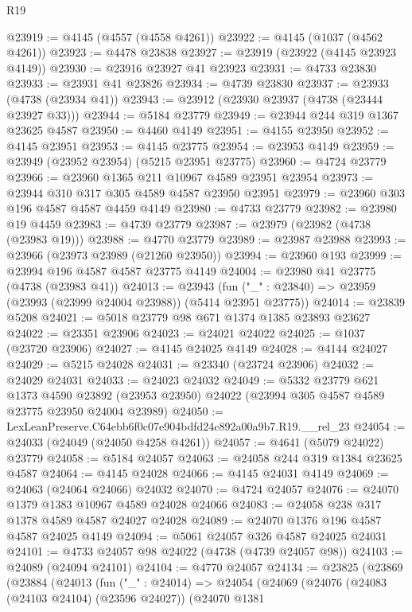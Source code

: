 \begin{lexlean}{R19}
\begin{coremodule}
@23919 := @4145 (@4557 (@4558 @4261))
@23922 := @4145 (@1037 (@4562 @4261))
@23923 := @4478 @23838
@23927 := @23919 (@23922 (@4145 @23923 @4149))
@23930 := @23916 @23927 @41 @23923
@23931 := @4733 @23830
@23933 := @23931 @41 @23826
@23934 := @4739 @23830
@23937 := @23933 (@4738 (@23934 @41))
@23943 := @23912 (@23930 @23937 (@4738 (@23444 @23927 @33)))
@23944 := @5184 @23779
@23949 := @23944 @244 @319 @1367 @23625 @4587
@23950 := @4460 @4149
@23951 := @4155 @23950
@23952 := @4145 @23951
@23953 := @4145 @23775
@23954 := @23953 @4149
@23959 := @23949 (@23952 @23954) (@5215 @23951 @23775)
@23960 := @4724 @23779
@23966 := @23960 @1365 @211 @10967 @4589 @23951 @23954
@23973 := @23944 @310 @317 @305 @4589 @4587 @23950 @23951
@23979 := @23960 @303 @196 @4587 @4587 @4459 @4149
@23980 := @4733 @23779
@23982 := @23980 @19 @4459
@23983 := @4739 @23779
@23987 := @23979 (@23982 (@4738 (@23983 @19)))
@23988 := @4770 @23779
@23989 := @23987 @23988
@23993 := @23966 (@23973 @23989 (@21260 @23950))
@23994 := @23960 @193
@23999 := @23994 @196 @4587 @4587 @23775 @4149
@24004 := @23980 @41 @23775 (@4738 (@23983 @41))
@24013 := @23943
    (fun ("_" : @23840) => @23959 (@23993 (@23999 @24004 @23988)) (@5414 @23951 @23775))
@24014 := @23839 @5208
@24021 := @5018 @23779 @98 @671 @1374 @1385 @23893 @23627
@24022 := @23351 @23906
@24023 := @24021 @24022
@24025 := @1037 (@23720 @23906)
@24027 := @4145 @24025 @4149
@24028 := @4144 @24027
@24029 := @5215 @24028
@24031 := @23340 (@23724 @23906)
@24032 := @24029 @24031
@24033 := @24023 @24032
@24049 := @5332
    @23779
    @621
    @1373
    @4590
    @23892
    (@23953 @23950)
    @24022
    (@23994 @305 @4587 @4589 @23775 @23950 @24004 @23989)
@24050 := LexLeanPreserve.C64ebb6f0c07e904bdfd24c892a00a9b7.R19.__rel_23
@24054 := @24033 (@24049 (@24050 @4258 @4261))
@24057 := @4641 (@5079 @24022) @23779
@24058 := @5184 @24057
@24063 := @24058 @244 @319 @1384 @23625 @4587
@24064 := @4145 @24028
@24066 := @4145 @24031 @4149
@24069 := @24063 (@24064 @24066) @24032
@24070 := @4724 @24057
@24076 := @24070 @1379 @1383 @10967 @4589 @24028 @24066
@24083 := @24058 @238 @317 @1378 @4589 @4587 @24027 @24028
@24089 := @24070 @1376 @196 @4587 @4587 @24025 @4149
@24094 := @5061 @24057 @326 @4587 @24025 @24031
@24101 := @4733 @24057 @98 @24022 (@4738 (@4739 @24057 @98))
@24103 := @24089 (@24094 @24101)
@24104 := @4770 @24057
@24134 := @23825
    (@23869
      (@23884
        (@24013
          (fun ("_" : @24014) =>
          @24054
            (@24069
              (@24076
                (@24083 (@24103 @24104) (@23596 @24027))
                (@24070
                  @1381

\end{coremodule}
\end{lexlean}
